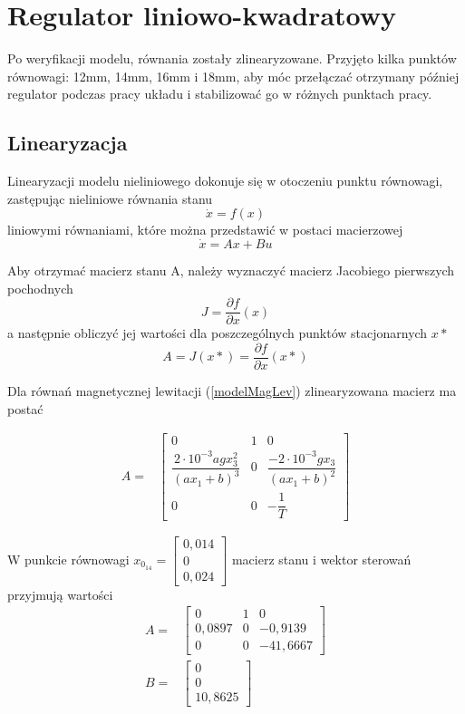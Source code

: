 \section{Regulator liniowo-kwadratowy}

Po weryfikacji modelu, równania zostały zlinearyzowane. Przyjęto kilka punktów równowagi: 12mm, 14mm, 16mm i 18mm, aby móc przełączać otrzymany później regulator podczas pracy układu i stabilizować go w różnych punktach pracy.

\subsection{Linearyzacja}

Linearyzacji modelu nieliniowego dokonuje się w otoczeniu punktu równowagi, zastępując nieliniowe równania stanu
\begin{equation}
\dot{x} = f(x)
\end{equation}
liniowymi równaniami, które można przedstawić w postaci macierzowej
\begin{equation}
\dot{x} = Ax + Bu
\end{equation}

Aby otrzymać macierz stanu A, należy wyznaczyć macierz Jacobiego pierwszych pochodnych
\begin{equation}
J = \dfrac{\partial f}{\partial x}(x)
\end{equation}
a następnie obliczyć jej wartości dla poszczególnych punktów stacjonarnych $x*$
\begin{equation}
A = J(x*) = \dfrac{\partial f}{\partial x}(x*)
\end{equation}

Dla równań magnetycznej lewitacji (\ref{modelMagLev}) zlinearyzowana macierz ma postać

\[
\begin{array}{lc}
A = &
\begin{bmatrix} 0 & 1 & 0 \\ \dfrac{2 \cdot 10^{-3} agx_3^2}{(ax_1+b)^3} & 0 & \dfrac{-2 \cdot 10^{-3} gx_3}{(ax_1+b)^2} \\ 0 & 0 & -\dfrac{1}{T}
\end{bmatrix}
\end{array}
\]

W punkcie równowagi $ x_{0_{14}} = \begin{bmatrix} 0,014 \\
0 \\
0,024
\end{bmatrix}
$ macierz stanu i wektor sterowań przyjmują wartości
\[
\begin{array}{lc}
A = &
\begin{bmatrix} 0 & 1 & 0 \\
0,0897 & 0 & -0,9139 \\
0 & 0 & -41,6667
\end{bmatrix}
\\
B = & \begin{bmatrix}
0 \\ 0 \\ 10,8625
\end{bmatrix}
\end{array}
\]

